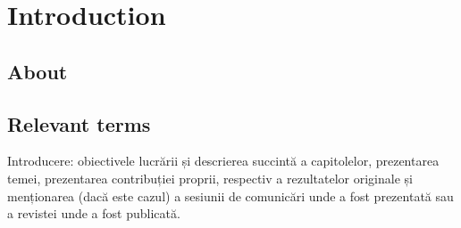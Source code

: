 \chapter{Introduction}
\label{chap:ch1}

\section{About}
\label{chap:ch1sec1}

\section{Relevant terms}
\label{chap:ch1sec2}

\par Introducere: obiectivele lucrării și descrierea succintă a capitolelor, prezentarea temei, prezentarea contribuției proprii, respectiv a rezultatelor originale și menționarea (dacă este cazul) a sesiunii de comunicări unde a fost prezentată sau a revistei unde a fost publicată.